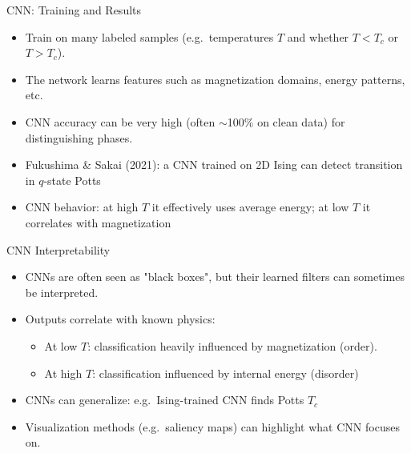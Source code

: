 \documentclass{beamer}
\begin{document}
\begin{frame}{CNN: Training and Results}
 \begin{itemize}
   \item Train on many labeled samples (e.g.\ temperatures $T$ and whether $T<T_c$ or $T>T_c$).
   \item The network learns features such as magnetization domains, energy patterns, etc.
   \item CNN accuracy can be very high (often $\sim$100\% on clean data) for distinguishing phases.
   \item Fukushima \& Sakai (2021): a CNN trained on 2D Ising can detect transition in $q$-state Potts 
   \item CNN behavior: at high $T$ it effectively uses average energy; at low $T$ it correlates with magnetization 
 \end{itemize}
\end{frame}

\begin{frame}{CNN Interpretability}
 \begin{itemize}
   \item CNNs are often seen as "black boxes", but their learned filters can sometimes be interpreted.
   \item Outputs correlate with known physics:
     \begin{itemize}
       \item At low $T$: classification heavily influenced by magnetization (order).
       \item At high $T$: classification influenced by internal energy (disorder) 
     \end{itemize}
   \item CNNs can generalize: e.g.\ Ising-trained CNN finds Potts $T_c$ 
   \item Visualization methods (e.g.\ saliency maps) can highlight what CNN focuses on.
 \end{itemize}
\end{frame}
\end{document}
